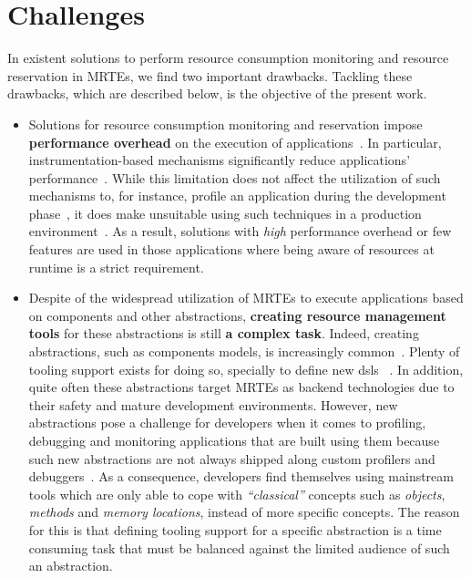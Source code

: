 \section{Challenges} \label{sec:intro-challenges}

In existent solutions to perform resource consumption monitoring and resource reservation in MRTEs, we find two important drawbacks.
Tackling these drawbacks, which are described below, is the objective of the present work.

\begin{itemize}
\item Solutions for resource consumption monitoring and reservation impose \textbf{performance overhead} on the execution of applications~\cite{Binder:2006:FEM:1173706.1173733,Marek:2012:DEL:2162037.2162046,Reiss:2008:CDP:1383559.1383566,Maurel:2012:AME:2304736.2304763}.
In particular, instrumentation-based mechanisms significantly reduce applications' performance~\cite{Dmitriev:2004:PJA:974043.974067,czajkowski_jres:_1998,Binder:2009:PPV:1464245.1464249}.
While this limitation does not affect the utilization of such mechanisms to, for instance, profile an application during the development phase~\cite{czajkowski_jres:_1998,binder_extending_2005,binder_portable_2001,Maebe06javana:a,Moret:2011:PBI:1960275.1960292, Hulaas:2008:PTL}, it does make unsuitable using such techniques in a production environment~\cite{Dmitriev:2004:PJA:974043.974067}.
As a result, solutions with \textit{high} performance overhead or few features are used in those applications where being aware of resources at runtime is a strict requirement.

\item Despite of the widespread utilization of MRTEs to execute applications based on components and other abstractions, \textbf{creating resource management tools} for these abstractions is still \textbf{a complex task}.
Indeed, creating abstractions, such as components models, is increasingly common~\cite{van2000domain,hutchinson2011empirical,whittle2014state}.
Plenty of tooling support exists for doing so, specially to define new \glspl{dsl} ~\cite{van2000domain,Fowler:2010:DSL:1809745,raey,Merkle:2010:TMT:1869542.1869564,Eysholdt:2010:XIY:1869542.1869625}.
In addition, quite often these abstractions target MRTEs as backend technologies due to their safety and mature development environments.
However, new abstractions pose a challenge for developers when it comes to profiling, debugging and monitoring applications that are built using them because such new abstractions are not always shipped along custom profilers and debuggers~\cite{Kolomvatsos:2012:DAC:2148250.2148478,Wu:2008:GGD:1394966.1394970,Mannadiar:2010:DDM:1964571.1964595,Lindeman:2011:DDD:2047862.2047885,Wu:2005:TDL:1094855.1094920,Faith1998}.
As a consequence, developers find themselves using mainstream tools which are only able to cope with \textit{``classical''} concepts such as \textit{objects}, \textit{methods} and \textit{memory locations}, instead of more specific concepts.
The reason for this is that defining tooling support for a specific abstraction is a time consuming task that must be balanced against the limited audience of such an abstraction.
\end{itemize}
 
